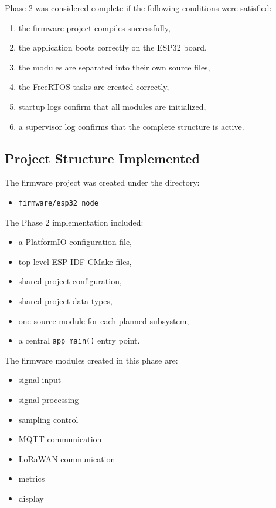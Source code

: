 \documentclass[12pt,a4paper]{article}
\begin{document}
Phase 2 was considered complete if the following conditions were satisfied:

\begin{enumerate}[label=\arabic*.]
    \item the firmware project compiles successfully,
    \item the application boots correctly on the ESP32 board,
    \item the modules are separated into their own source files,
    \item the FreeRTOS tasks are created correctly,
    \item startup logs confirm that all modules are initialized,
    \item a supervisor log confirms that the complete structure is active.
\end{enumerate}

\subsection{Project Structure Implemented}

The firmware project was created under the directory:

\begin{itemize}
    \item \texttt{firmware/esp32\_node}
\end{itemize}

The Phase 2 implementation included:

\begin{itemize}
    \item a PlatformIO configuration file,
    \item top-level ESP-IDF CMake files,
    \item shared project configuration,
    \item shared project data types,
    \item one source module for each planned subsystem,
    \item a central \texttt{app\_main()} entry point.
\end{itemize}

The firmware modules created in this phase are:

\begin{itemize}
    \item signal input
    \item signal processing
    \item sampling control
    \item MQTT communication
    \item LoRaWAN communication
    \item metrics
    \item display
\end{itemize}
\end{document}
